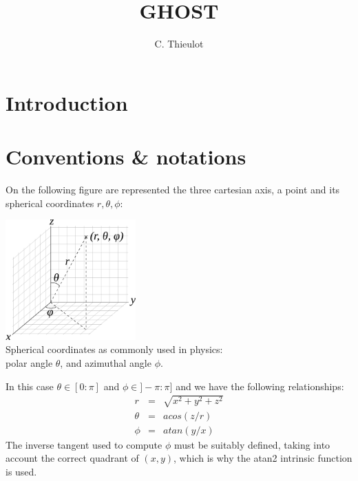 \documentclass[a4paper]{article}
\author{C. Thieulot}
\title{GHOST}
\begin{document}
\maketitle
\tableofcontents

\section{Introduction}



\section{Conventions \& notations}

On the following figure are represented the three cartesian axis, 
a point and its spherical coordinates $r,\theta,\phi$:
\begin{center}
\includegraphics[width=5cm]{images/sphcoord}\\
{\small Spherical coordinates as commonly used in physics:\\ polar angle $\theta$, and azimuthal angle $\phi$.} 
\end{center}
In this case $\theta\in[0:\pi]$ and $\phi\in]-\pi:\pi]$ and we have the following relationships:
\begin{eqnarray}
r &=& \sqrt{x^2+y^2+z^2} \\
\theta &=& acos (z/r) \\
\phi &=& atan (y/x) 
\end{eqnarray}
The inverse tangent used to compute $\phi$ must be suitably defined, taking into account the correct quadrant of $(x,y)$,
which is why the atan2 intrinsic function is used.    
\end{document}
